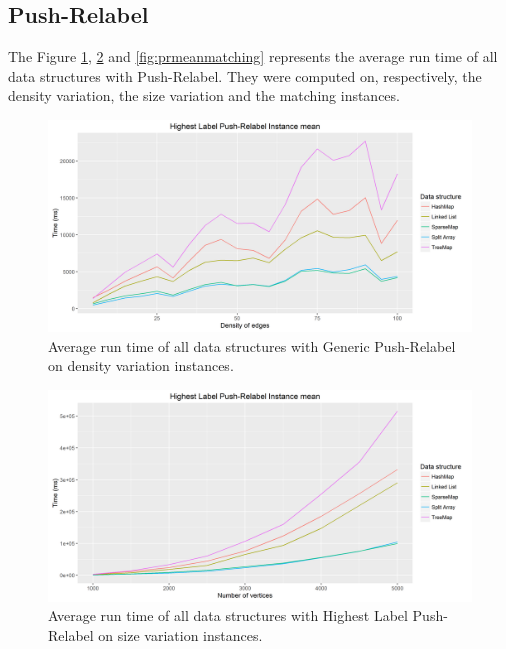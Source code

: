 \subsection{Push-Relabel}	
The Figure \ref{fig:prmeandensity}, \ref{fig:prmeansize} and \ref{fig:prmeanmatching} represents the average run time of all data structures with Push-Relabel. They were computed on, respectively, the density variation, the size variation and the matching instances.
\begin{figure}[H]
\begin{center}
\includegraphics[scale=0.5]{images/prmeandensity.png}
\caption{Average run time of all data structures with Generic Push-Relabel on density variation instances.}
\label{fig:prmeandensity}
\end{center}
\end{figure}
\begin{figure}[H]
\begin{center}
\includegraphics[scale=0.5]{images/prmeansize.png}
\caption{Average run time of all data structures with Highest Label Push-Relabel on size variation instances.}
\label{fig:prmeansize}
\end{center}
\end{figure}
